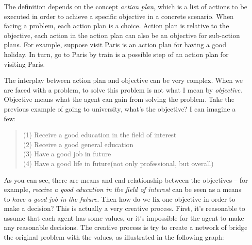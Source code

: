 The definition depends on the concept \emph{action plan}, which is a list of actions to be executed in order to achieve a specific objective in a concrete scenario. When facing a problem, each action plan is a choice. Action plan is relative to the objective, each action in the action plan can also be an objective for sub-action plans. For example, suppose visit Paris is an action plan for having a good holiday. In turn, go to Paris by train is a possible step of an action plan for visiting Paris.

The interplay between action plan and objective can be very complex. When we are faced with a problem, to solve this problem is not what I mean by \emph{objective}. Objective means what the agent can gain from solving the problem. Take the previous example of going to university, what's the objective? I can imagine a few:

\begin{quote}
(1) Receive a good education in the field of interest \\
(2) Receive a good general education \\
(3) Have a good job in future \\
(4) Have a good life in future(not only professional, but overall)
\end{quote}

As you can see, there are means and end relationship between the objectives -- for example, \emph{receive a good education in the field of interest} can be seen as a means to \emph{have a good job in the future}. Then how do we fix one objective in order to make a decision? This is actually a very creative process. First, it's reasonable to assume that each agent has some values, or it's impossible for the agent to make any reasonable decisions. The creative process is try to create a network of bridge the original problem with the values, as illustrated in the following graph:

